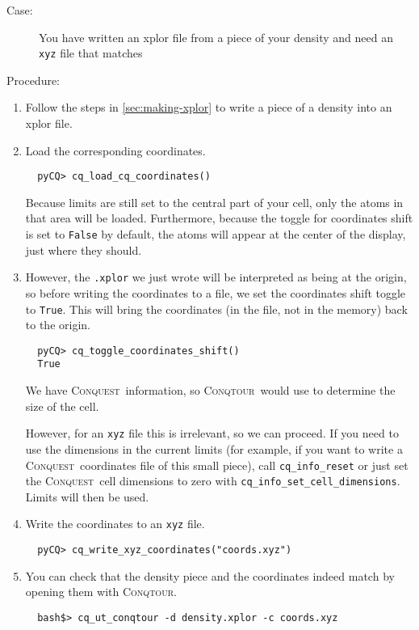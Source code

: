 \documentclass[a4paper,notitlepage,11pt]{article}
\def\CQ{\textsc{Conquest}}
\def\Conqtour{\textsc{Conqtour}}
\begin{document}
\begin{description}
\item[Case: ] You have written an xplor file from a piece of your density and need an \texttt{xyz}
file that matches
\item[Procedure: ] 
\end{description}
\begin{enumerate}
  \item Follow the steps in \ref{sec:making-xplor} to write a piece of a density into an xplor file.
  \item Load the corresponding coordinates.
{\scriptsize
  \begin{verbatim}
  pyCQ> cq_load_cq_coordinates()
  \end{verbatim}
  }  
  Because limits are still set to the central part of your cell, only the atoms in that area will be loaded. Furthermore, because
  the toggle for coordinates shift is set to \texttt{False} by default, the atoms will appear at the center of the display, just
  where they should.
  \item However, the \texttt{.xplor} we just wrote will be interpreted as being at the origin, so before writing the coordinates
  to a file, we set the coordinates shift toggle to \texttt{True}. This will bring the coordinates (in the file, not in the
  memory) back to the origin.
{\scriptsize
  \begin{verbatim}
  pyCQ> cq_toggle_coordinates_shift()
  True
  \end{verbatim}
  }
  We have \CQ\ information, so \Conqtour\ would use to determine the size of the cell. 
  
  However, for an \texttt{xyz} file this is
  irrelevant, so we can proceed. If you need to use the dimensions in the current limits (for example, if you want to write a \CQ\
  coordinates file of this small piece), call \texttt{cq\_info\_reset} or just set the \CQ\ cell dimensions to zero with
  \texttt{cq\_info\_set\_cell\_dimensions}. Limits will then be used.
  \item Write the coordinates to an \texttt{xyz} file.  
{\scriptsize
  \begin{verbatim}
  pyCQ> cq_write_xyz_coordinates("coords.xyz")
  \end{verbatim}
  }
  \item You can check that the density piece and the coordinates indeed match by opening them with \Conqtour.
{\scriptsize
  \begin{verbatim}
  bash$> cq_ut_conqtour -d density.xplor -c coords.xyz
  \end{verbatim}
  }
\end{enumerate}


\clearpage
\thispagestyle{index}
\pagestyle{index}
{}
\printindex
\end{document}

